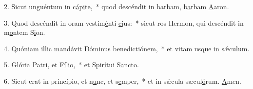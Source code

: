 2. Sicut unguéntum in c\uline{á}p\uline{i}te,~* quod descéndit in barbam, b\uline{a}rbam \uline{A}aron.\par 
3. Quod descéndit in oram vestim\uline{é}nti \uline{e}jus:~* sicut ros Hermon, qui descéndit in m\uline{o}ntem S\uline{i}on.\par 
4. Quóniam illic mandávit Dóminus bened\uline{i}cti\uline{ó}nem,~* et vitam \uline{u}sque in s\uline{ǽ}culum.\par 
5. Glória Patri, et F\uline{í}l\uline{i}o,~* et Spir\uline{í}tui S\uline{a}ncto.\par 
6. Sicut erat in princípio, et n\uline{u}nc, et s\uline{e}mper,~* et in sǽcula sæcul\uline{ó}rum. \uline{A}men.\par 
